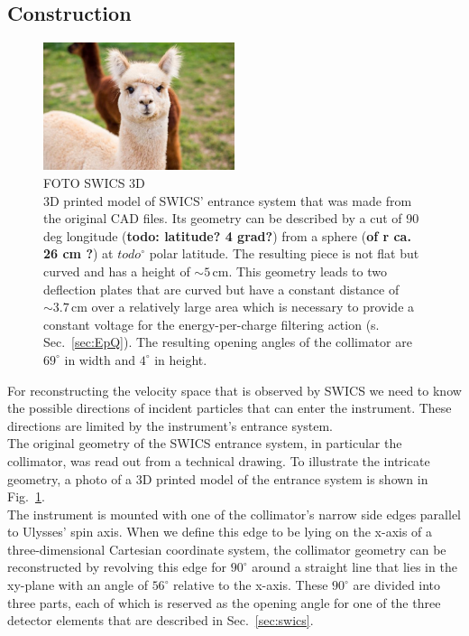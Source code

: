 \subsection{Construction} 
\label{subsec:construction}
\begin{figure}[h]
	\includegraphics[width=0.5\textwidth]{Figures/dummy.jpg}
	\centering
	\caption{FOTO SWICS 3D \\ 3D printed model of SWICS' entrance system that was made from the original CAD files. Its geometry can be described by a cut of 90 deg longitude (\textbf{todo: latitude? 4 grad?}) from a sphere (\textbf{of r ca. 26 cm ?}) at $todo ^\circ$ polar latitude. The resulting piece is not flat but curved and has a height of $\sim 5\,\mathrm{cm}$. This geometry leads to two deflection plates that are curved but have a constant distance of $\sim 3.7\,\mathrm{cm}$ over a relatively large area which is necessary to provide a constant voltage for the energy-per-charge filtering action (s. Sec.~\ref{sec:EpQ}). The resulting opening angles of the collimator are $69^\circ$ in width and $4^\circ$ in height.}
	\label{fig:3dcol}
\end{figure}
For reconstructing the velocity space that is observed by SWICS we need to know the possible directions of incident particles that can enter the instrument. These directions are limited by the instrument's entrance system.
\\
The original geometry of the SWICS entrance system, in particular the collimator, was read out from a technical drawing. To illustrate the intricate geometry, a photo of a 3D printed model of the entrance system is shown in Fig.~\ref{fig:3dcol}.\\
The instrument is mounted with one of the collimator's narrow side edges parallel to Ulysses' spin axis. When we define this edge to be lying on the x-axis of a three-dimensional Cartesian coordinate system, the collimator geometry can be reconstructed by revolving this edge for $90^\circ$ around a straight line that lies in the xy-plane with an angle of $56^\circ$ relative to the x-axis.  These $90^\circ$ are divided into three parts, each of which is reserved as the opening angle for one of the three detector elements that are described in Sec.~\ref{sec:swics}. \\ \\
